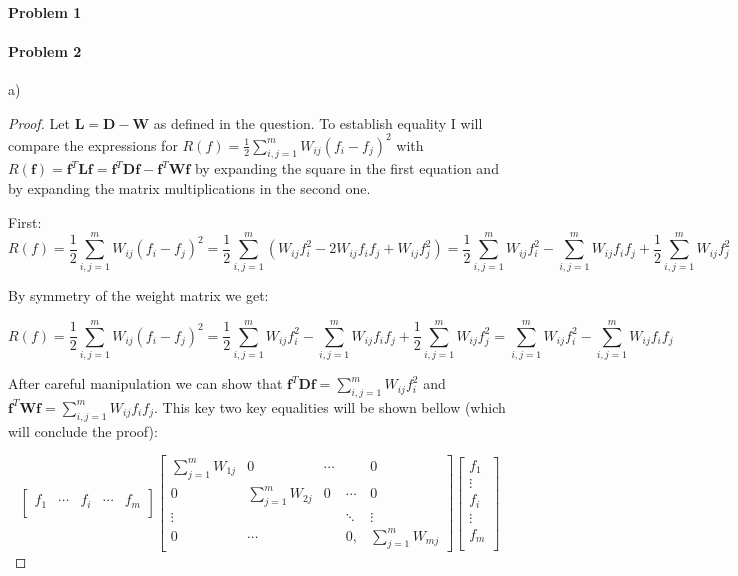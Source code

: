 \documentclass[12pt]{report}
\begin{document}
\maketitle

\paragraph{Problem 1}

\paragraph{Problem 2}
a)

\begin{proof} Let $\mathbf{L} = \mathbf{D} - \mathbf{W}$ as defined in the question. 
To establish equality I will compare the expressions for $R(f) = \frac{1}{2}\sum^m_{i,j=1} W_{ij}(f_i - f_j)^2$ with $R(\mathbf{f}) = \mathbf{f}^T\mathbf{L}\mathbf{f} = \mathbf{f}^T\mathbf{D}\mathbf{f} - \mathbf{f}^T\mathbf{W}\mathbf{f} $ by expanding the square in the first equation and by expanding the matrix multiplications in the second one.

First:
 $$R(f) = \frac{1}{2}\sum^m_{i,j=1} W_{ij}(f_i - f_j)^2 = \frac{1}{2}\sum^m_{i,j=1} (W_{ij}f_i^2 -2W_{ij}f_if_j + W_{ij}f_j^2) = \frac{1}{2}\sum^m_{i,j=1} W_{ij}f_i^2 -\sum^m_{i,j=1}W_{ij}f_if_j + \frac{1}{2}\sum^m_{i,j=1}W_{ij}f_j^2 $$
 
 By symmetry of the weight matrix we get:
 
 $$R(f) = \frac{1}{2}\sum^m_{i,j=1} W_{ij}(f_i - f_j)^2 = \frac{1}{2}\sum^m_{i,j=1} W_{ij}f_i^2 -\sum^m_{i,j=1}W_{ij}f_if_j + \frac{1}{2}\sum^m_{i,j=1}W_{ij}f_j^2 = \sum^m_{i,j=1} W_{ij}f_i^2 -\sum^m_{i,j=1}W_{ij}f_if_j  $$
  
After careful manipulation we can show that 
$\mathbf{f}^T\mathbf{D}\mathbf{f} =  \sum^m_{i,j=1} W_{ij}f_i^2 $ 
and 
$\mathbf{f}^T\mathbf{W}\mathbf{f} = \sum^m_{i,j=1}W_{ij}f_if_j $. This key two key equalities will be shown bellow (which will conclude the proof):
  
$$
\begin{bmatrix}
f_1& \cdots & f_i & \cdots & f_m\\
\end{bmatrix} 
\begin{bmatrix}
\sum_{j=1}^{m}W_{1j} & 0 & \cdots &  & 0 \\
0 & \sum_{j=1}^{m}W_{2j} & 0 & \cdots  & 0 \\
\vdots &   &  &  \ddots  & \vdots \\
0 & \cdots &  & 0, & \sum_{j=1}^{m}W_{mj}
\end{bmatrix} 
\begin{bmatrix}
f_1\\ 
\vdots \\
f_i \\
\vdots \\
f_m\\
\end{bmatrix}
$$


\end{proof}
\end{document}
